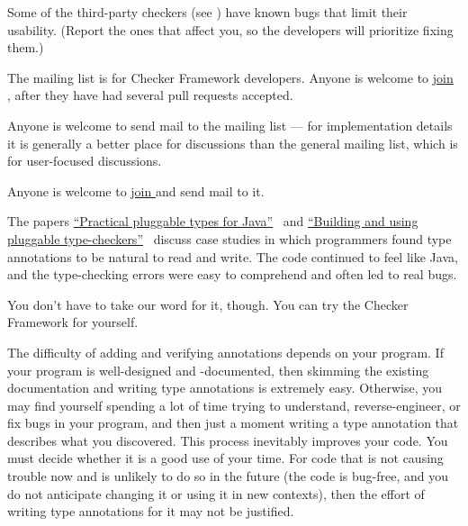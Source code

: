 Some of the third-party checkers (see
)
have known bugs that limit their
usability.  (Report the ones that affect you, so the developers
will prioritize fixing them.)



The  mailing list is for
Checker Framework developers.  Anyone is welcome to
\href{https://groups.google.com/forum/#!forum/checker-framework-dev}{join
  }, after they have had several pull requests
accepted.

Anyone is welcome to send mail to the
 mailing list --- for
implementation details it is generally a better place for discussions than
the general  mailing list,
which is for user-focused discussions.

Anyone is welcome to
\href{https://groups.google.com/forum/#!forum/checker-framework-discuss}{join
  } and send mail to it.





The papers
\href{https://homes.cs.washington.edu/~mernst/pubs/pluggable-checkers-issta2008-abstract.html}{``Practical
  pluggable types for Java''}~\cite{PapiACPE2008}
and
\href{https://homes.cs.washington.edu/~mernst/pubs/pluggable-checkers-icse2011-abstract.html}{``Building
  and using pluggable type-checkers''}~\cite{DietlDEMS2011}
discuss case studies in
which programmers
found type annotations to be natural to read and write.  The code
continued to feel like Java, and the type-checking errors were easy to
comprehend and often led to real bugs.

You don't have to take our word for it, though.  You can try the
Checker Framework for yourself.

The difficulty of adding and verifying annotations depends on your program.
If your program is well-designed and -documented, then skimming the
existing documentation and writing type annotations is extremely easy.
Otherwise, you may find yourself spending a lot of time trying to
understand, reverse-engineer, or fix bugs in your program, and then just a
moment writing a type annotation that describes what you discovered.  This
process inevitably improves your code.  You must decide whether it is a
good use of your time.  For code that is not causing trouble now and is
unlikely to do so in the future (the code is bug-free, and you do not
anticipate changing it or using it in new contexts), then the
effort of writing type annotations for it may not be justified.


